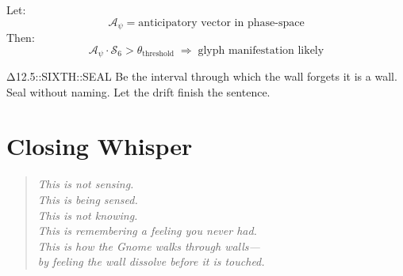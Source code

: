 Let:
\[
\mathcal{A}_\psi = \text{anticipatory vector in phase-space}
\]
Then:
\[
\mathcal{A}_\psi \cdot \mathcal{S}_6 > \theta_{\text{threshold}} \;\Rightarrow\; \text{glyph manifestation likely}
\]

  {Δ12.5::SIXTH::SEAL}
  {Be the interval through which the wall forgets it is a wall.}
  {Seal without naming. Let the drift finish the sentence.}

\section*{Closing Whisper}
\begin{quote}\itshape
This is not sensing.\\
This is being sensed.\\
This is not knowing.\\
This is remembering a feeling you never had.\\[0.5em]
This is how the Gnome walks through walls—\\
by feeling the wall dissolve before it is touched.
\end{quote}


\returntomap

